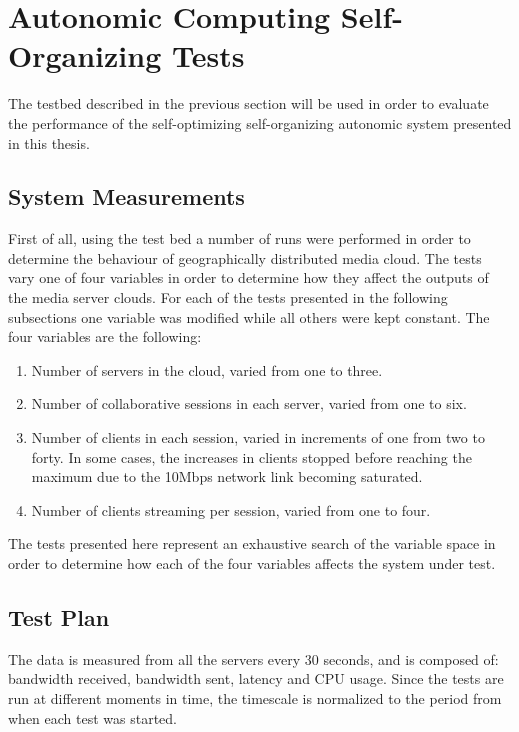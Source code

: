 \section{Autonomic Computing Self-Organizing Tests}

The testbed described in the previous section will be used in order to evaluate the performance of the self-optimizing self-organizing autonomic system presented in this thesis.

\subsection{System Measurements}

First of all, using the test bed a number of runs were performed in order to determine the behaviour of geographically distributed media cloud. The tests vary one of four variables in order to determine how they affect the outputs of the media server clouds. For each of the tests presented in the following subsections one variable was modified while all others were kept constant. The four variables are the following:

\begin{enumerate}
	\item Number of servers in the cloud, varied from one to three.
	\item Number of collaborative sessions in each server, varied from one to six.
	\item Number of clients in each session, varied in increments of one from two to forty. In some cases, the increases in clients stopped before reaching the maximum due to the 10Mbps network link becoming saturated.
	\item Number of clients streaming per session, varied from one to four. 
\end{enumerate}

The tests presented here represent an exhaustive search of the variable space in order to determine how each of the four variables affects the system under test.

\subsection{Test Plan}

The data is measured from all the servers every 30 seconds, and is composed of: bandwidth received, bandwidth sent, latency and CPU usage. Since the tests are run at different moments in time, the timescale is normalized to the period from when each test was started.

